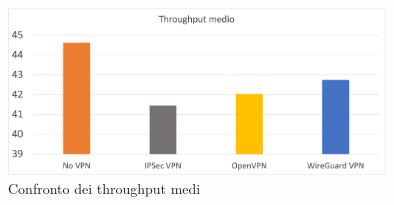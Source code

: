 \begin{figure}[ht]
    \centering
    \includegraphics[width=10cm]{figure/avg.png}
    \caption{Confronto dei throughput medi}
\end{figure}